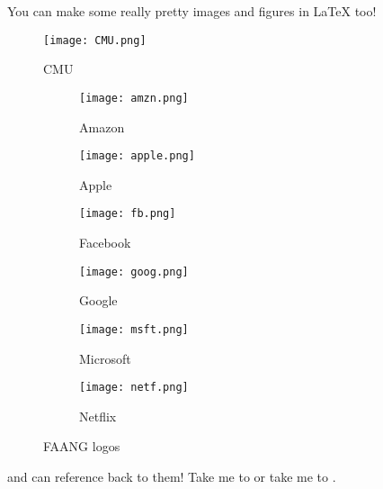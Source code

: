 \documentclass[]{plaid-homework}
\begin{document}
\newpage

You can make some really pretty images and figures in LaTeX too!

\vspace{7em}

\begin{figure}[h]
  \centering
  \texttt{[image: CMU.png]}
  \caption{CMU}
  \label{fig:CMU}
\end{figure}

\vspace{7em}

\begin{figure}[h]
  \begin{subfigure}[t]{0.33\textwidth}
    \centering
    \texttt{[image: amzn.png]}
    \caption{Amazon}
    \label{fig:Amazon}
  \end{subfigure}
  \begin{subfigure}[t]{0.33\textwidth}
    \centering
    \texttt{[image: apple.png]}
    \caption{Apple}
    \label{fig:Apple}
  \end{subfigure}
  \begin{subfigure}[t]{0.33\textwidth}
    \centering
    \texttt{[image: fb.png]}
    \caption{Facebook}
    \label{fig:Facebook}
  \end{subfigure}
  \begin{subfigure}[t]{0.33\textwidth}
    \centering
    \texttt{[image: goog.png]}
    \caption{Google}
    \label{fig:Google}
  \end{subfigure}
  \begin{subfigure}[t]{0.33\textwidth}
    \centering
    \texttt{[image: msft.png]}
    \caption{Microsoft}
    \label{fig:Microsoft}
  \end{subfigure}
  \begin{subfigure}[t]{0.33\textwidth}
    \centering
    \texttt{[image: netf.png]}
    \caption{Netflix}
    \label{fig:Netflix}
  \end{subfigure}
  \caption{FAANG logos}
  \label{fig:FAANG}
\end{figure}

\vspace{7em}

and can reference back to them! Take me to  or take me to  .
\end{document}
